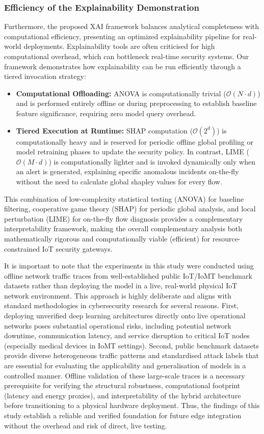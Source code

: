 \documentclass[a4paper,fleqn]{cas-sc}
\begin{document}
\subsubsection{Efficiency of the Explainability Demonstration}
Furthermore, the proposed XAI framework balances analytical completeness with computational efficiency, presenting an optimized explainability pipeline for real-world deployments. Explainability tools are often criticised for high computational overhead, which can bottleneck real-time security systems. Our framework demonstrates how explainability can be run efficiently through a tiered invocation strategy:
\begin{itemize}
    \item \textbf{Computational Offloading:} ANOVA is computationally trivial ($\mathcal{O}(N \cdot d)$) and is performed entirely offline or during preprocessing to establish baseline feature significance, requiring zero model query overhead.
    \item \textbf{Tiered Execution at Runtime:} SHAP computation ($\mathcal{O}(2^d)$) is computationally heavy and is reserved for periodic offline global profiling or model retraining phases to update the security policy. In contrast, LIME ($\mathcal{O}(M \cdot d)$) is computationally lighter and is invoked dynamically only when an alert is generated, explaining specific anomalous incidents on-the-fly without the need to calculate global shapley values for every flow.
\end{itemize}
This combination of low-complexity statistical testing (ANOVA) for baseline filtering, cooperative game theory (SHAP) for periodic global analysis, and local perturbation (LIME) for on-the-fly flow diagnosis provides a complementary interpretability framework, making the overall complementary analysis both mathematically rigorous and computationally viable (efficient) for resource-constrained IoT security gateways.

It is important to note that the experiments in this study were conducted using offline network traffic traces from well-established public IoT/IoMT benchmark datasets rather than deploying the model in a live, real-world physical IoT network environment. This approach is highly deliberate and aligns with standard methodologies in cybersecurity research for several reasons. First, deploying unverified deep learning architectures directly onto live operational networks poses substantial operational risks, including potential network downtime, communication latency, and service disruption to critical IoT nodes (especially medical devices in IoMT settings). Second, public benchmark datasets provide diverse heterogeneous traffic patterns and standardised attack labels that are essential for evaluating the applicability and generalisation of models in a controlled manner. Offline validation of these large-scale traces is a necessary prerequisite for verifying the structural robustness, computational footprint (latency and energy proxies), and interpretability of the hybrid architecture before transitioning to a physical hardware deployment. Thus, the findings of this study establish a reliable and verified foundation for future edge integration without the overhead and risk of direct, live testing.
\end{document}
